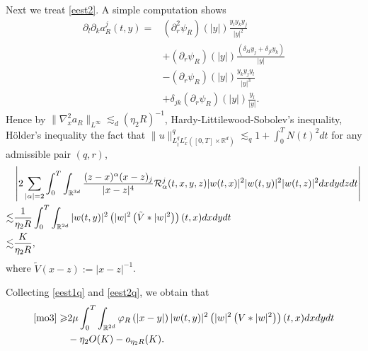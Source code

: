 \documentclass[reqno,11pt]{amsart}
\theoremstyle{plain}
\theoremstyle{definition}
\numberwithin{equation}{section}
\numberwithin{theorem}{section}
\def\geq{\geqslant}
\def\R{\mathbb{R}}
\begin{document}
Next we treat \eqref{eest2}. A simple computation shows
\begin{align*}
\partial_{l} \partial_{k} a_{R}^{j}(t, y)= & \left(\partial_{r}^{2} \psi_{R}\right)(|y|) \frac{y_{l} y_{k} y_{j}}{|y|^{2}} \\
& +\left(\partial_{r} \psi_{R}\right)(|y|) \frac{\left(\delta_{k l} y_{j}+\delta_{j l} y_{k}\right)}{|y|}  \\
& -\left(\partial_{r} \psi_{R}\right)(|y|) \frac{y_{k} y_{j} y_{l}}{|y|^{3}} \\
& +\delta_{j k}\left(\partial_{r} \psi_{R}\right)(|y|) \frac{y_{l}}{|y|}.
\end{align*}
 Hence by $\|\nabla_x^2a_R\|_{L^\infty}\lesssim_d(\eta_2R)^{-1}$, Hardy-Littilewood-Sobolev's inequality, H\"older's inequality the fact that $\|u\|^q_{L_t^qL_x^r([0,T]\times\R^d)}\lesssim_{q}1+ \int_0^T N(t)^2 dt$ for any admissible pair $(q,r)$,
\begin{align}
& \left|2 \sum_{|\alpha|=2} \int_{0}^{T} \int_{\mathbb{R}^{3d}} \frac{(z-x)^{\alpha}(x-z)_{j}}{|x-z|^{4}} \mathcal{R}_{\alpha}^{j}(t, x, y, z)|w(t, x)|^{2}|w(t, y)|^{2}|w(t, z)|^{2} d x d y d z d t \right|\notag \\
 \lesssim& \frac{1}{\eta_2 R}\int_{0}^{T} \int_{\mathbb{R}^{2d}} |w(t, y)|^{2}\left(|w|^{2}\left(\tilde{V} *|w|^{2}\right)\right)(t, x) d x d y d t \notag \\
\lesssim& \frac{K}{\eta_2 R},\label{eest2q}
\end{align}
where $\tilde{V}(x-z):=|x-z|^{-1}$.

Collecting \eqref{eest1q} and \eqref{eest2q}, we obtain that
\begin{align}\label{interme}
    \eqref{mo3}\geq& 2\mu \int_{0}^{T} \int_{\mathbb{R}^{2d}} \varphi_{R}\left(|x-y|\right)|w(t, y)|^{2}\left(|w|^{2}\left(V *|w|^{2}\right)\right)(t, x) d x d y d t \notag\\
&-\eta_2O(K)-o_{\eta_2R}(K).
\end{align}
\end{document}
